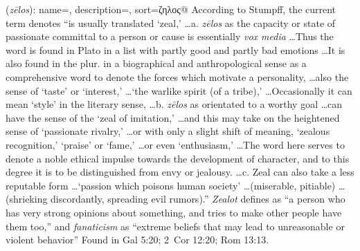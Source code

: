 \item[Fanaticism,]

(\textit{zēlos}):
{
    name=,
    description={},
    sort=ζηλος@
}
According to Stumpff, the current term denotes ``is usually translated `zeal,' \ldots a. \emph{zēlos} as the capacity or state of passionate committal to a person or cause is essentially \emph{vox media} \ldots Thus the word is found in Plato in a list with partly good and partly bad emotions \ldots It is also found in the plur. in a biographical and anthropological sense as a comprehensive word to denote the forces which motivate a personality, \ldots also the sense of `taste' or `interest,' \ldots `the warlike spirit (of a tribe),' \ldots Occasionally it can mean `style' in the literary sense, \ldots b. \emph{zēlos} as orientated to a worthy goal \ldots can have the sense of  the `zeal of imitation,' \ldots and this may take on the heightened sense of `passionate rivalry,' \ldots or with only a slight shift of meaning, `zealous recognition,' `praise' or `fame,' \ldots or even `enthusiasm,' \ldots The word here serves  to denote a noble ethical impulse towards the development of character, and to this degree it is to be distinguished from envy or jealousy. \ldots c. Zeal can also take a less reputable form \ldots `passion which poisons human society' \ldots (miserable, pitiable) \ldots (shrieking discordantly, spreading evil rumors).''
\emph{Zealot} defines as ``a person who has very strong opinions about something, and tries to make other people have them too,'' and \emph{fanaticism} as ``extreme beliefs that may lead to unreasonable or violent behavior''
Found in Gal 5:20; 2~Cor 12:20; Rom 13:13.
